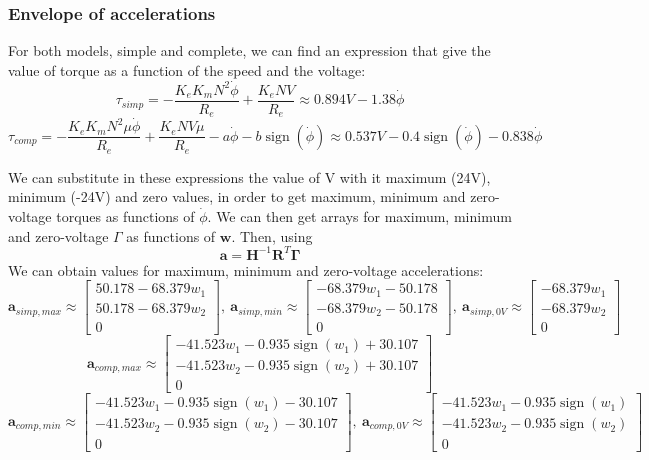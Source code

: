 \documentclass[12pt]{article}
\renewcommand{\vec}[1]{\bm{#1}}
\newcommand{\R}{\mathbb R}
\def\R{\vec R}
\begin{document}
\subsubsection*{Envelope of accelerations}
For both models, simple and complete, we can find an expression that give the value of torque as a function of the speed and the voltage:
$$\tau_{simp} = \displaystyle - \frac{K_{e} K_{m} N^{2} \dot{\phi}}{R_{e}} + \frac{K_{e} N V}{R_{e}} \approx 0.894 V - 1.38 \dot{\phi}$$
$$\tau_{comp} = - \frac{K_{e} K_{m} N^{2} \mu \dot{\phi}}{R_{e}} + \frac{K_{e} N V \mu}{R_{e}} - a \dot{\phi} - b \operatorname{sign}\left(\dot{\phi}\right)\approx 0.537 V - 0.4 \operatorname{sign}\left(\dot{\phi}\right) - 0.838 \dot{\phi}$$

We can substitute in these expressions the value of V with it maximum (24V), minimum (-24V) and zero values, in order to get maximum, minimum and zero-voltage torques as functions of $\dot \phi$. We can then get arrays for maximum, minimum and zero-voltage $\Gamma$ as functions of $\vec w$. Then, using
$$\vec a = \vec H^{-1} \R^{T} \vec \Gamma$$ 
We can obtain values for maximum, minimum and zero-voltage accelerations:
$$\vec a_{simp, max} \approx \left[\begin{matrix}50.178 - 68.379 w_{1}\\50.178 - 68.379 w_{2}\\0\end{matrix}\right], \  \vec a_{simp, min} \approx \left[\begin{matrix}- 68.379 w_{1} - 50.178\\- 68.379 w_{2} - 50.178\\0\end{matrix}\right], \  \vec a_{simp, 0V} \approx \left[\begin{matrix}- 68.379 w_{1}\\- 68.379 w_{2}\\0\end{matrix}\right]$$
$$\vec a_{comp, max} \approx \left[\begin{matrix}- 41.523 w_{1} - 0.935 \operatorname{sign}\left(w_{1}\right) + 30.107\\- 41.523 w_{2} - 0.935 \operatorname{sign}\left(w_{2}\right) + 30.107\\0\end{matrix}\right]$$
$$\vec a_{comp, min} \approx  \left[\begin{matrix}- 41.523 w_{1} - 0.935 \operatorname{sign}\left(w_{1}\right) - 30.107\\- 41.523 w_{2} - 0.935 \operatorname{sign}\left(w_{2}\right) - 30.107\\0\end{matrix}\right], \ \vec a_{comp, 0V} \approx   \left[\begin{matrix}- 41.523 w_{1} - 0.935 \operatorname{sign}\left(w_{1}\right)\\- 41.523 w_{2} - 0.935 \operatorname{sign}\left(w_{2}\right)\\0\end{matrix}\right]$$
\end{document}
